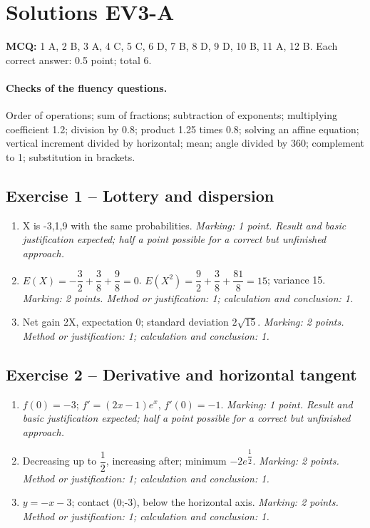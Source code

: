\mxnewpage\section*{Solutions EV3-A}\label{EV3-A-CORR}
\textbf{MCQ:} 1 A, 2 B, 3 A, 4 C, 5 C, 6 D, 7 B, 8 D, 9 D, 10 B, 11 A, 12 B. Each correct answer: \num{0,5} point; total 6.
\paragraph{Checks of the fluency questions.} Order of operations; sum of fractions; subtraction of exponents; multiplying coefficient \num{1,2}; division by \num{0,8}; product \num{1,25} times \num{0,8}; solving an affine equation; vertical increment divided by horizontal; mean; angle divided by 360; complement to 1; substitution in brackets.
\subsection*{Exercise 1 -- Lottery and dispersion}
\begin{enumerate}
\item X is -3,1,9 with the same probabilities. \textit{Marking: 1 point. Result and basic justification expected; half a point possible for a correct but unfinished approach.}
\item $E(X)=-\dfrac{3}{2}+\dfrac{3}{8}+\dfrac{9}{8}=0$. $E(X^2)=\dfrac{9}{2}+\dfrac{3}{8}+\dfrac{81}{8}=15$; variance 15. \textit{Marking: 2 points. Method or justification: 1; calculation and conclusion: 1.}
\item Net gain 2X, expectation 0; standard deviation $2\sqrt{15}$. \textit{Marking: 2 points. Method or justification: 1; calculation and conclusion: 1.}
\end{enumerate}
\subsection*{Exercise 2 -- Derivative and horizontal tangent}
\begin{enumerate}
\item $f(0)=-3$; $f\prime=(2x-1)e^x$, $f\prime(0)=-1$. \textit{Marking: 1 point. Result and basic justification expected; half a point possible for a correct but unfinished approach.}
\item Decreasing up to $\dfrac{1}{2}$, increasing after; minimum $-2e^{\dfrac{1}{2}}$. \textit{Marking: 2 points. Method or justification: 1; calculation and conclusion: 1.}
\item $y=-x-3$; contact (0;-3), below the horizontal axis. \textit{Marking: 2 points. Method or justification: 1; calculation and conclusion: 1.}
\end{enumerate}
